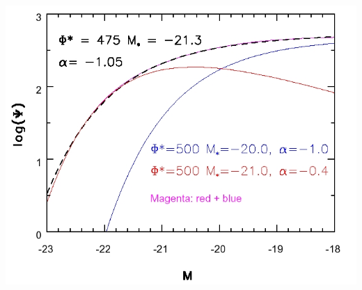 \documentclass[letterpaper,landscape]{slides}
\begin{document}
\begin{slide}

\includegraphics{figures/Schechter.jpg}



\vfill
\end{slide}
 
\end{document}
